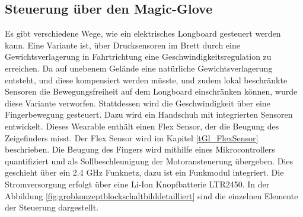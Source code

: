 \subsection*{Steuerung über den Magic-Glove}
Es gibt verschiedene Wege, wie ein elektrisches Longboard gesteuert werden kann. Eine Variante ist, über Drucksensoren im Brett durch eine Gewichtsverlagerung in Fahrtrichtung eine Geschwindigkeitsregulation zu erreichen. Da auf unebenem Gelände eine natürliche Gewichtsverlagerung entsteht, und diese kompensiert werden müsste, und zudem lokal beschränkte Sensoren die Bewegungsfreiheit auf dem Longboard einschränken können, wurde diese Variante verworfen. Stattdessen wird die Geschwindigkeit über eine Fingerbewegung gesteuert. Dazu wird ein Handschuh mit integrierten Sensoren entwickelt. Dieses Wearable enthält einen Flex Sensor, der die Beugung des Zeigefinders misst. Der Flex Sensor wird im Kapitel \ref{tGl_FlexSensor} beschrieben. Die Beugung des Fingers wird mithilfe eines Mikrocontrollers quantifiziert und als Sollbeschleunigung der Motoransteuerung übergeben. Dies geschieht über ein 2.4 GHz Funknetz, dazu ist ein Funkmodul integriert. Die Stromversorgung erfolgt über eine Li-Ion Knopfbatterie LTR2450. 
In der Abbildung \ref{fig:grobkonzeptblockschaltbilddetailliert} sind die einzelnen Elemente der Steuerung dargestellt.

